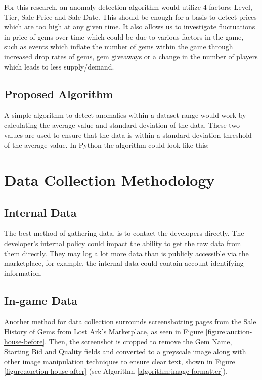 \documentclass[journal]{IEEEtran}
\begin{document}
For this research, an anomaly detection algorithm would utilize 4 factors; Level, Tier, Sale Price and Sale Date. This should be enough for a basis to detect prices which are too high at any given time. It also allows us to investigate fluctuations in price of gems over time which could be due to various factors in the game, such as events which inflate the number of gems within the game through increased drop rates of gems, gem giveaways or a change in the number of players which leads to less supply/demand.

\subsection{Proposed Algorithm}
\noindent A simple algorithm to detect anomalies within a dataset range would work by calculating the average value and standard deviation of the data. These two values are used to ensure that the data is within a standard deviation threshold of the average value. In Python the algorithm could look like this:


\section{Data Collection Methodology}
\subsection{Internal Data}
\noindent The best method of gathering data, is to contact the developers directly. The developer's internal policy could impact the ability to get the raw data from them directly. They may log a lot more data than is publicly accessible via the marketplace, for example, the internal data could contain account identifying information.

\subsection{In-game Data}
\noindent Another method for data collection surrounds screenshotting pages from the Sale History of Gems from Lost Ark's Marketplace, as seen in Figure \ref{figure:auction-house-before}. Then, the screenshot is cropped to remove the Gem Name, Starting Bid and Quality fields and converted to a greyscale image along with other image manipulation techniques to ensure clear text, shown in Figure \ref{figure:auction-house-after} (see Algorithm \ref{algorithm:image-formatter}).
\end{document}
